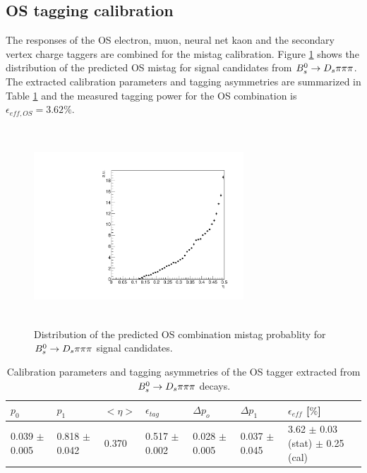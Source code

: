 \subsection{OS tagging calibration}
\label{subsec: OScalibration}
The responses of the OS electron, muon, neural net kaon and the secondary vertex charge taggers are combined for the mistag calibration. 
Figure \ref{fig:OSdistribution} shows the distribution of the predicted OS mistag for signal candidates from ${{B}^0_{s}}\rightarrow{\ensuremath{{D}_{s}}}{\ensuremath{\pi}}{\ensuremath{\pi}}{\ensuremath{\pi}}$. 
The extracted calibration parameters and tagging asymmetries are summarized in Table \ref{table: OScalibration} and the measured tagging power for the OS combination is $\epsilon_{eff,OS} = 3.62 \%$.

\begin{figure}[h]
\centering
\includegraphics[height=7.4cm,width=0.7\textwidth]{figs/Tagging/OS_combination_etaDis.pdf}
\caption{Distribution of the predicted OS combination mistag probablity for ${{B}^0_{s}}\rightarrow{\ensuremath{{D}_{s}}}{\ensuremath{\pi}}{\ensuremath{\pi}}{\ensuremath{\pi}}$ signal candidates.}
\label{fig:OSdistribution}
\end{figure}


\begin{table}[h]
\centering
\scriptsize
 \begin{tabular}{l l l l | l l | l}
\hline
$p_{0}$ & $p_{1}$ & $<\eta>$ & $\epsilon_{tag}$ & $\Delta p_{o}$ & $\Delta p_{1}$ & $\epsilon_{eff}$ [$\%$] \\
\hline
0.039 $\pm$0.005  & 0.818 $\pm$ 0.042 & 0.370 & 0.517 $\pm$ 0.002 & 0.028 $\pm$ 0.005 & 0.037 $\pm$ 0.045 & 3.62 $\pm$ 0.03 (stat) $\pm$ 0.25 (cal) \\
\hline
\end{tabular}
\caption{Calibration parameters and tagging asymmetries of the OS tagger extracted from ${{B}^0_{s}}\rightarrow{\ensuremath{{D}_{s}}}{\ensuremath{\pi}}{\ensuremath{\pi}}{\ensuremath{\pi}}$ decays.}
\label{table: OScalibration}
\normalsize
\end{table}


